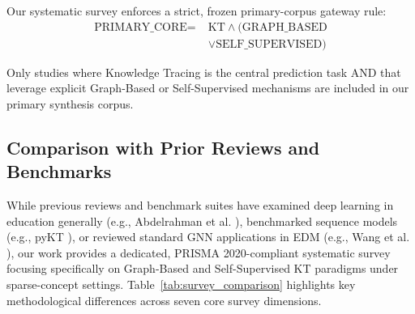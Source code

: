 \documentclass[journal]{IEEEtran}
\begin{document}
Our systematic survey enforces a strict, frozen primary-corpus gateway rule:
\begin{equation}
\begin{split}
\text{PRIMARY\_CORE} = \; & \text{KT} \land (\text{GRAPH\_BASED} \\
& \lor \text{SELF\_SUPERVISED})
\end{split}
\end{equation}

Only studies where Knowledge Tracing is the central prediction task AND that leverage explicit Graph-Based or Self-Supervised mechanisms are included in our primary synthesis corpus.

\subsection{Comparison with Prior Reviews and Benchmarks}
While previous reviews and benchmark suites have examined deep learning in education generally (e.g., Abdelrahman et al. \cite{Abdelrahman_Survey_2023}), benchmarked sequence models (e.g., pyKT \cite{Liu_pyKT_2022}), or reviewed standard GNN applications in EDM (e.g., Wang et al. \cite{Wang_GraphKT_2024}), our work provides a dedicated, PRISMA 2020-compliant systematic survey focusing specifically on Graph-Based and Self-Supervised KT paradigms under sparse-concept settings. Table~\ref{tab:survey_comparison} highlights key methodological differences across seven core survey dimensions.
\end{document}
